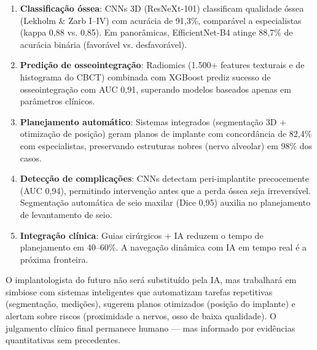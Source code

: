 \begin{enumerate}
    \item \textbf{Classificação óssea}: CNNs 3D (ResNeXt-101) classificam qualidade óssea (Lekholm \& Zarb I--IV) com acurácia de 91,3\%, comparável a especialistas (kappa 0,88 vs. 0,85). Em panorâmicas, EfficientNet-B4 atinge 88,7\% de acurácia binária (favorável vs. desfavorável).
    
    \item \textbf{Predição de osseointegração}: Radiomics (1.500+ features texturais e de histograma do CBCT) combinada com XGBoost prediz sucesso de osseointegração com AUC 0,91, superando modelos baseados apenas em parâmetros clínicos.
    
    \item \textbf{Planejamento automático}: Sistemas integrados (segmentação 3D + otimização de posição) geram planos de implante com concordância de 82,4\% com especialistas, preservando estruturas nobres (nervo alveolar) em 98\% dos casos.
    
    \item \textbf{Detecção de complicações}: CNNs detectam peri-implantite precocemente (AUC 0,94), permitindo intervenção antes que a perda óssea seja irreversível. Segmentação automática de seio maxilar (Dice 0,95) auxilia no planejamento de levantamento de seio.
    
    \item \textbf{Integração clínica}: Guias cirúrgicos + IA reduzem o tempo de planejamento em 40--60\%. A navegação dinâmica com IA em tempo real é a próxima fronteira.
\end{enumerate}

O implantologista do futuro não será substituído pela IA, mas trabalhará em simbiose com sistemas inteligentes que automatizam tarefas repetitivas (segmentação, medições), sugerem planos otimizados (posição do implante) e alertam sobre riscos (proximidade a nervos, osso de baixa qualidade). O julgamento clínico final permanece humano --- mas informado por evidências quantitativas sem precedentes.

